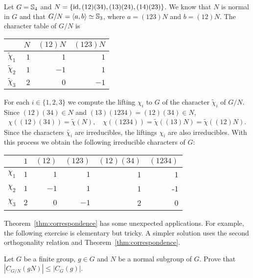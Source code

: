 \begin{example}
    Let $G=\mathbb{S}_4$ and $N=\{\operatorname{id},(12)(34),(13)(24),(14)(23)\}$. We know that $N$ is normal in $G$ 
    and that $G/N=\langle a,b\rangle\simeq\mathbb{S}_3$, where 
    $a=(123)N$ and $b=(12)N$. 
    The character table of $G/N$ is 
    \begin{center}
		\begin{tabular}{|c|rrr|}
			\hline
			& $N$ & $(12)N$ & $(123)N$ \tabularnewline
			\hline 
			$\widetilde{\chi}_{1}$ & $1$ & $1$ & $1$\tabularnewline
			$\widetilde{\chi}_{2}$ & $1$ & $-1$ & $1$ \tabularnewline
			$\widetilde{\chi}_{3}$ & $2$ & $0$ & $-1$ \tabularnewline
			\hline
		\end{tabular}
	\end{center}
    For each $i\in\{1,2,3\}$ we compute the lifting $\chi_i$ to $G$ of the character  
    $\widetilde{\chi}_i$ of $G/N$. 
    Since $(12)(34)\in N$ and $(13)(1234)=(12)(34)\in N$, 
    \begin{align*}
        \chi( (12)(34) )=\widetilde{\chi}(N),\quad
        \chi( (1234) )=\widetilde{\chi}((13)N)=\widetilde{\chi}((12)N).
    \end{align*}
    Since the characters $\widetilde{\chi_i}$ are irreducibles, 
    the liftings $\chi_i$ are also irreducibles. With this process
    we obtain the following irreducible characters of $G$:
    	\begin{center}
		\begin{tabular}{|c|rrrrr|}
			\hline
			& $1$ & $(12)$ & $(123)$ & $(12)(34)$ & $(1234)$ \tabularnewline
			\hline 
			$\chi_{1}$ & $1$ & $1$ & $1$ & 1 & 1\tabularnewline
			$\chi_{2}$ & $1$ & $-1$ & $1$ & 1 & -1 \tabularnewline
			$\chi_{3}$ & $2$ & $0$ & $-1$ & 2 & 0\tabularnewline
			\hline
		\end{tabular}
	\end{center}
\end{example}

Theorem~\ref{thm:correspondence} has some unexpected applications. For example, the following exercise is elementary but tricky. A simpler solution uses the second orthogonality relation and Theorem~\ref{thm:correspondence}.

\begin{exercise}
\label{xca:centralizer}
    Let $G$ be a finite group, $g\in G$ and $N$ be a normal subgroup of $G$. 
    Prove that $|C_{G/N}(gN)|\leq|C_G(g)|$. 
\end{exercise}



